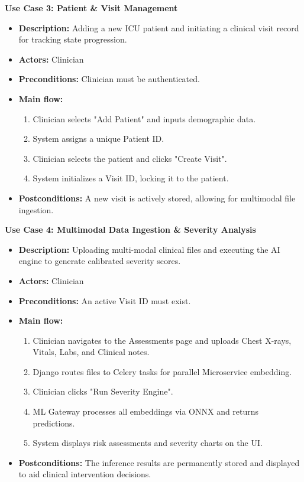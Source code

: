 \documentclass{fisatprojectfinal}
\begin{document}
\textbf{Use Case 3: Patient \& Visit Management}
\begin{itemize}
    \item[\textbf{|_______}] \textbf{Description:} Adding a new ICU patient and initiating a clinical visit record for tracking state progression.
    \item[\textbf{|_______}] \textbf{Actors:} Clinician
    \item[\textbf{|_______}] \textbf{Preconditions:} Clinician must be authenticated.
    \item[\textbf{|_______}] \textbf{Main flow:}
    \begin{enumerate}
        \item Clinician selects "Add Patient" and inputs demographic data.
        \item System assigns a unique Patient ID.
        \item Clinician selects the patient and clicks "Create Visit".
        \item System initializes a Visit ID, locking it to the patient.
    \end{enumerate}
    \item[\textbf{|_______}] \textbf{Postconditions:} A new visit is actively stored, allowing for multimodal file ingestion.
\end{itemize}

\textbf{Use Case 4: Multimodal Data Ingestion \& Severity Analysis}
\begin{itemize}
    \item[\textbf{|_______}] \textbf{Description:} Uploading multi-modal clinical files and executing the AI engine to generate calibrated severity scores.
    \item[\textbf{|_______}] \textbf{Actors:} Clinician
    \item[\textbf{|_______}] \textbf{Preconditions:} An active Visit ID must exist.
    \item[\textbf{|_______}] \textbf{Main flow:}
    \begin{enumerate}
        \item Clinician navigates to the Assessments page and uploads Chest X-rays, Vitals, Labs, and Clinical notes.
        \item Django routes files to Celery tasks for parallel Microservice embedding.
        \item Clinician clicks "Run Severity Engine".
        \item ML Gateway processes all embeddings via ONNX and returns predictions.
        \item System displays risk assessments and severity charts on the UI.
    \end{enumerate}
    \item[\textbf{|_______}] \textbf{Postconditions:} The inference results are permanently stored and displayed to aid clinical intervention decisions.
\end{itemize}
\end{document}
